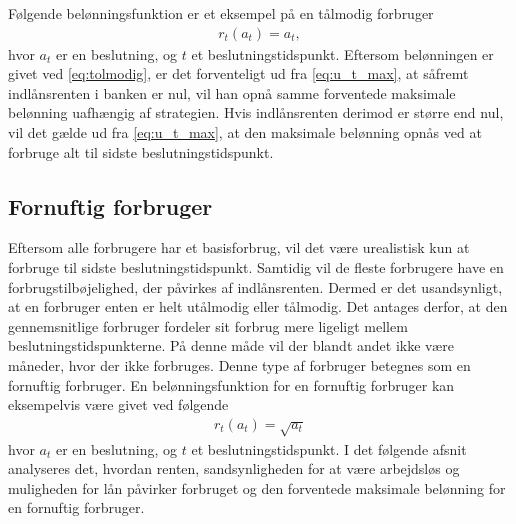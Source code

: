Følgende belønningsfunktion er et eksempel på en tålmodig forbruger
\begin{align}\label{eq:tolmodig}
    r_t(a_t) = a_t,
\end{align}
hvor $a_t$ er en beslutning, og $t$ et beslutningstidspunkt. Eftersom belønningen er givet ved \eqref{eq:tolmodig}, er det forventeligt ud fra \eqref{eq:u_t_max}, at såfremt indlånsrenten i banken er nul, vil han opnå samme forventede maksimale belønning uafhængig af strategien.
Hvis indlånsrenten derimod er større end nul, vil det gælde ud fra \eqref{eq:u_t_max}, at den maksimale belønning opnås ved at forbruge alt til sidste beslutningstidspunkt. 

\subsection{Fornuftig forbruger}
Eftersom alle forbrugere har et basisforbrug, vil det være urealistisk kun at forbruge til sidste beslutningstidspunkt. Samtidig vil de fleste forbrugere have en forbrugstilbøjelighed, der påvirkes af indlånsrenten. Dermed er det usandsynligt, at en forbruger enten er helt utålmodig eller tålmodig. Det antages derfor, at den gennemsnitlige forbruger fordeler sit forbrug mere ligeligt mellem beslutningstidspunkterne. På denne måde vil der blandt andet ikke være måneder, hvor der ikke forbruges. Denne type af forbruger betegnes som en fornuftig forbruger. En belønningsfunktion for en fornuftig forbruger kan eksempelvis være givet ved følgende
\begin{align}\label{eq:belønning_fornuftig_forbruger}
    r_t(a_t) = \sqrt{a_t}
\end{align}
hvor $a_t$ er en beslutning, og $t$ et beslutningstidspunkt. I det følgende afsnit analyseres det, hvordan renten, sandsynligheden for at være arbejdsløs og muligheden for lån påvirker forbruget og den forventede maksimale belønning for en fornuftig forbruger.






